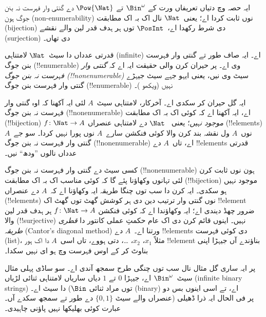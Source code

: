 \documentclass[../../../include/open-logic-section]{subfiles}
\begin{document}


\begin{editorial}
  ایہ حصہ  وچ دتیاں تعریفاں ورت کے $\Bin^\omega$ تے
  $\Pow{\Nat}$ دے گنتی وار فہرست نہ بنن جوگ ہون (non-enumerability)
  نوں ثابت کردا اے؛ یعنی~$\Nat$ نال اک بہ اک مطابقت (bijection) دی
  شرط رکھدا اے،~$\PosInt$ توں ہر ہدف قدر لین والے نقشے (surjection)
  دی تھاں۔
\end{editorial}

\begin{explain}
قدرتی عدداں دا سیٹ~$\Nat$ لامتناہی (infinite) اے۔ ایہ صاف طور تے
گنتی وار فہرست بنن جوگ (!!{enumerable}) وی اے۔ پر حیران کرن والی
حقیقت ایہ اے کہ \emph{گنتی وار فہرست نہ بنن جوگ
(!!{nonenumerable})} سیٹ وی نیں، یعنی ایہو جہے سیٹ جیہڑے گنتی وار
فہرست بنن جوگ (!!{enumerable}) نہیں
(ویکھو )۔

ایہ گل حیران کر سکدی اے۔ آخرکار، لامتناہی سیٹ~$A$ لئی ایہ آکھنا کہ
اوہ گنتی وار فہرست نہ بنن جوگ (!!{nonenumerable}) اے، ایہ آکھنا اے
کہ کوئی اک بہ اک مطابقت
(!!{bijection}) $f \colon \Nat \to A$ \emph{موجود نہیں}؛ یعنی
~$\Nat$ دے لامتناہی عنصراں (!!{element}s) نوں~$A$ ول نقشہ بند کرن
والا کوئی فنکشن سارے~$A$ نوں پورا نہیں کردا۔ سو جے~$A$ گنتی وار
فہرست نہ بنن جوگ (!!{nonenumerable}) اے، تاں~$A$ دے
!!{element}s قدرتی عدداں نالوں ”ودھ“ نیں۔

کسی سیٹ دے گنتی وار فہرست نہ بنن جوگ (!!{nonenumerable}) ہون نوں
ثابت کرن لئی تہانوں وکھاؤنا پئے گا کہ کوئی مناسب اک بہ اک مطابقت
(!!{bijection}) موجود نہیں ہو سکدی۔ ایہ کرن دا سب توں چنگا طریقہ ایہ
وکھاؤنا اے کہ~$A$ دے عنصراں (!!{element}s) نوں گنتی وار ترتیب دین دی
ہر کوشش گھٹ توں گھٹ اک !!{element} ضرور چھڈ دیندی اے؛ ایہ وکھاؤندا اے
کہ کوئی فنکشن $f\colon \Nat \to A$ ہر ہدف قدر لین والا
(!!{surjective}) نہیں۔ اینوں قائم کرن دی اک عام حکمتِ عملی کانتور دا
\emph{قطری طریقہ} (Cantor's diagonal method) ورتنا اے۔~$A$ دے
!!{element}s دی کوئی فہرست (list)، مثلاً $x_1$، $x_2$، \dots، دتی
ہووے، تاں اسی~$A$ دا اک ہور !!{element} بناؤندے آں جیہڑا اپنی بناوٹ
کر کے اوس فہرست وچ ہو ای نہیں سکدا۔

پر ایہ ساری گل مثال نال سب توں چنگی طرح سمجھ آندی اے۔ سو ساڈی پہلی
مثال سیٹ~$\Bin^\omega$ اے، جیہڑا $0$ تے $1$ دیاں ساریاں لامتناہی
ثنائی لڑیاں (infinite binary strings) دا سیٹ اے۔ ($\Bin$ توں مراد
ثنائی (binary) اے، تے اسی اینوں بس دو عنصراں والے سیٹ
$\{0,1\}$ دے طور تے سمجھ سکدے آں۔)
پر فی الحال ایہ ذرا ڈھیلی عبارت کوئی بھلیکھا نہیں پاؤنی چاہیدی۔
\end{explain}
\end{document}
